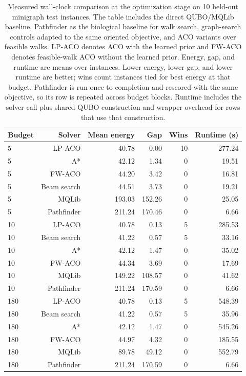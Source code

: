 \documentclass[11pt]{article}
\begin{document}
\begin{table}[t]
\centering
\scriptsize
\caption{Measured wall-clock comparison at the optimization stage on 10 held-out minigraph test instances. The table includes the direct QUBO/MQLib baseline, Pathfinder as the biological baseline for walk search, graph-search controls adapted to the same oriented objective, and ACO variants over feasible walks. LP-ACO denotes ACO with the learned prior and FW-ACO denotes feasible-walk ACO without the learned prior. Energy, gap, and runtime are means over instances. Lower energy, lower gap, and lower runtime are better; wins count instances tied for best energy at that budget. Pathfinder is run once to completion and rescored with the same objective, so its row is repeated across budget blocks. Runtime includes the solver call plus shared QUBO construction and wrapper overhead for rows that use that construction.}
\label{tab:qubo-stage}
\begin{tabular}{lrrrrr}
\hline
Budget & Solver & Mean energy & Gap & Wins & Runtime (s) \\
\hline
5 & LP-ACO & 40.78 & 0.00 & 10 & 277.24 \\
5 & A* & 42.12 & 1.34 & 0 & 19.51 \\
5 & FW-ACO & 44.20 & 3.42 & 0 & 16.81 \\
5 & Beam search & 44.51 & 3.73 & 0 & 19.21 \\
5 & MQLib & 193.03 & 152.26 & 0 & 25.05 \\
5 & Pathfinder & 211.24 & 170.46 & 0 & 6.66 \\
\hline
10 & LP-ACO & 40.78 & 0.13 & 5 & 285.53 \\
10 & Beam search & 41.22 & 0.57 & 5 & 33.16 \\
10 & A* & 42.12 & 1.47 & 0 & 35.02 \\
10 & FW-ACO & 44.34 & 3.69 & 0 & 17.69 \\
10 & MQLib & 149.22 & 108.57 & 0 & 41.62 \\
10 & Pathfinder & 211.24 & 170.59 & 0 & 6.66 \\
\hline
180 & LP-ACO & 40.78 & 0.13 & 5 & 548.39 \\
180 & Beam search & 41.22 & 0.57 & 5 & 35.96 \\
180 & A* & 42.12 & 1.47 & 0 & 545.26 \\
180 & FW-ACO & 44.97 & 4.32 & 0 & 185.55 \\
180 & MQLib & 89.78 & 49.12 & 0 & 552.79 \\
180 & Pathfinder & 211.24 & 170.59 & 0 & 6.66 \\
\hline
\end{tabular}
\end{table}
\end{document}
